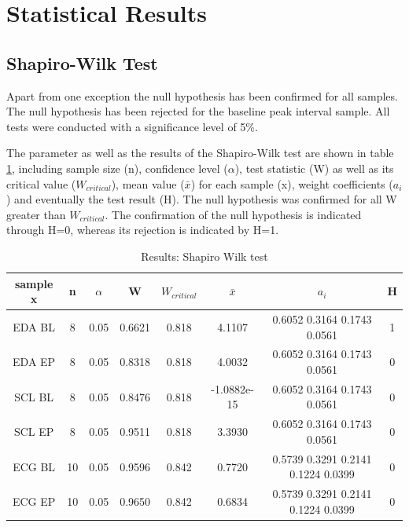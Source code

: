 \newpage
\section{Statistical Results}

\subsection{Shapiro-Wilk Test}
Apart from one exception the null hypothesis has been confirmed for all samples. The null hypothesis has been rejected for the baseline peak interval sample. All tests were conducted with a significance level of 5\%.

The parameter as well as the results of the Shapiro-Wilk test are shown in table \ref{shapirowilk}, including sample size (n), confidence level ($\alpha$), test statistic (W) as well as its critical value ($W_{critical}$), mean value ($\bar{x}$) for each sample (x), weight coefficients ($a_{i}$) and eventually the test result (H). The null hypothesis was confirmed for all W greater than $W_{critical}$. The confirmation of the null hypothesis is indicated through H=0, whereas its rejection is indicated by H=1.

\begin{table}[h]
\centering
\caption{Results: Shapiro Wilk test}
\begin{tabular}{|c|c|c|c|c|c|c|c|}
\hline
sample x & n & $\alpha$ & W & $W_{critical}$ & $\bar{x}$ & $a_{i}$ & H\\
\hline
EDA BL & 8 & 0.05 &  0.6621 & 0.818 & 4.1107 & 0.6052 0.3164 0.1743 0.0561 & 1\\
\hline
EDA EP & 8 & 0.05 &  0.8318 & 0.818 & 4.0032 & 0.6052 0.3164 0.1743 0.0561 & 0\\
\hline
SCL BL & 8 & 0.05 &  0.8476 & 0.818 & -1.0882e-15 & 0.6052 0.3164 0.1743 0.0561 & 0\\
\hline
SCL EP & 8 & 0.05 &  0.9511 & 0.818 & 3.3930 & 0.6052 0.3164 0.1743 0.0561 & 0\\
\hline
ECG BL & 10 & 0.05 & 0.9596 & 0.842 & 0.7720 & 0.5739 0.3291 0.2141 0.1224 0.0399 & 0\\
\hline
ECG EP & 10 & 0.05 & 0.9650 & 0.842 & 0.6834 & 0.5739 0.3291 0.2141 0.1224 0.0399 & 0\\ 
\hline	
\end{tabular}
\label{shapirowilk}
\end{table}

%
%

